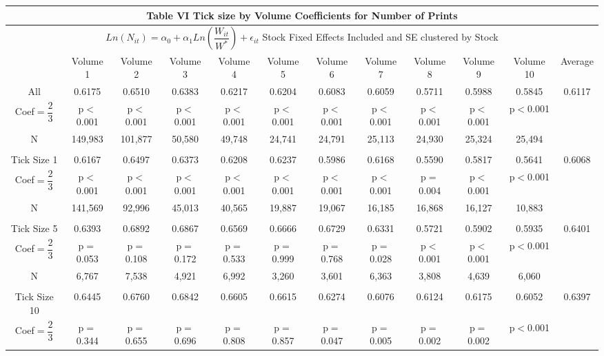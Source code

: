 \documentclass[]{article}
\begin{document}
\newpage
\begin{landscape}
\begin{table}[!ht]
\begin{tabular}{cccccccccccc}
\multicolumn{12}{c}{Table VI Tick size by Volume Coefficients for Number of Prints} \\
\hline
\multicolumn{12}{c}{$Ln(N_{it}) = \alpha_{0} + \alpha_{1}Ln(\dfrac{W_{it}}{W^{*}}) + \epsilon_{it}$ Stock Fixed Effects Included and SE clustered by Stock} \\
& Volume 1 & Volume 2 & Volume 3 & Volume 4 & Volume 5 & Volume 6 & Volume 7 & Volume 8 & Volume 9 & Volume 10 & Average \\ \hline
All & 0.6175 & 0.6510 & 0.6383 & 0.6217 & 0.6204 & 0.6083 & 0.6059 & 0.5711 & 0.5988 & 0.5845 & 0.6117 \\
Coef$=\dfrac{2}{3}$ & p$<$0.001 & p$<$0.001 & p$<$0.001 & p$<$0.001 & p$<$0.001 & p$<$0.001 & p$<$0.001 & p$<$0.001 & p$<$0.001 & p$<$0.001 & \\
N & 149,983 & 101,877 & 50,580 & 49,748 & 24,741 & 24,791 & 25,113 & 24,930 & 25,324 & 25,494 &  \\
& & & & & & & & & & & \\
Tick Size 1 & 0.6167 & 0.6497 & 0.6373 & 0.6208 & 0.6237 & 0.5986 & 0.6168 & 0.5590 & 0.5817 & 0.5641 & 0.6068\\
Coef$=\dfrac{2}{3}$ & p$<$0.001 & p$<$0.001 & p$<$0.001 & p$<$0.001 & p$<$0.001 & p$<$0.001 & p$<$0.001 & p$=$0.004 & p$<$0.001 & p$<$0.001 & \\
N & 141,569 & 92,996 & 45,013 & 40,565 & 19,887 & 19,067 & 16,185 & 16,868 & 16,127 & 10,883 & \\
& & & & & & & & & & & \\
Tick Size 5 & 0.6393 & 0.6892 & 0.6867 & 0.6569 & 0.6666 & 0.6729 & 0.6331 & 0.5721 & 0.5902 & 0.5935 & 0.6401 \\
Coef$=\dfrac{2}{3}$ & p$=$0.053 & p$=$0.108 & p$=$0.172 & p$=$0.533 & p$=$0.999 & p$=$0.768 & p$=$0.028 & p$<$0.001 & p$<$0.001 & p$<$0.001 & \\
N & 6,767 & 7,538 & 4,921 & 6,992 & 3,260 & 3,601 & 6,363 & 3,808 & 4,639 & 6,060 & \\
& & & & & & & & & & & \\
Tick Size 10 & 0.6445 & 0.6760 & 0.6842 & 0.6605 & 0.6615 & 0.6274 & 0.6076 & 0.6124 & 0.6175 & 0.6052 & 0.6397 \\
Coef$=\dfrac{2}{3}$ & p$=$0.344 & p$=$0.655 & p$=$0.696 & p$=$0.808 & p$=$0.857 & p$=$0.047 & p$=$0.005 & p$=$0.002 & p$=$0.002 & p$<$0.001 & \\

\end{tabular}
\end{table}
\end{landscape}
\end{document}
